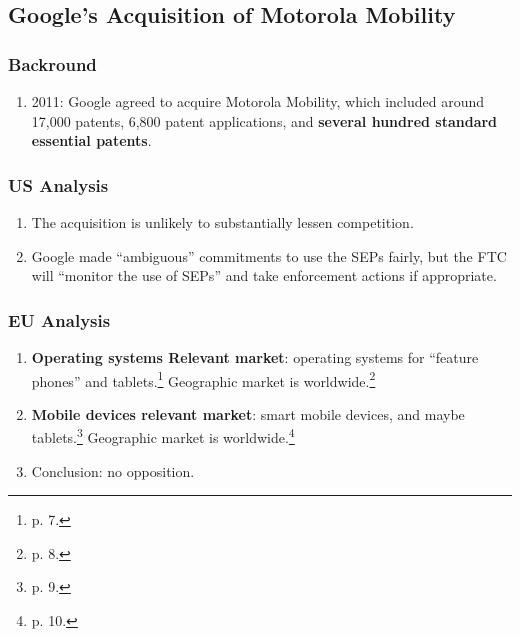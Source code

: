 \subsection{Google's Acquisition of Motorola Mobility}

\subsubsection{Backround}

\begin{enumerate}
    \item 2011: Google agreed to acquire Motorola Mobility, which included 
    around 17,000 patents, 6,800 patent applications, and \textbf{several 
    hundred standard essential patents}.
\end{enumerate}

\subsubsection{US Analysis}

\begin{enumerate}
    \item The acquisition is unlikely to substantially lessen competition.
    \item Google made ``ambiguous'' commitments to use the SEPs fairly, but 
    the FTC will ``monitor the use of SEPs'' and take enforcement actions if 
    appropriate.
\end{enumerate}

\subsubsection{EU Analysis}

\begin{enumerate}
    \item \textbf{Operating systems Relevant market}: operating systems for 
    ``feature phones'' and tablets.\footnote{p. 7.} Geographic market is 
    worldwide.\footnote{p. 8.}
    \item \textbf{Mobile devices relevant market}: smart mobile devices, and 
    maybe tablets.\footnote{p. 9.} Geographic market is worldwide.\footnote{p. 
    10.}
    \item Conclusion: no opposition.
\end{enumerate}
